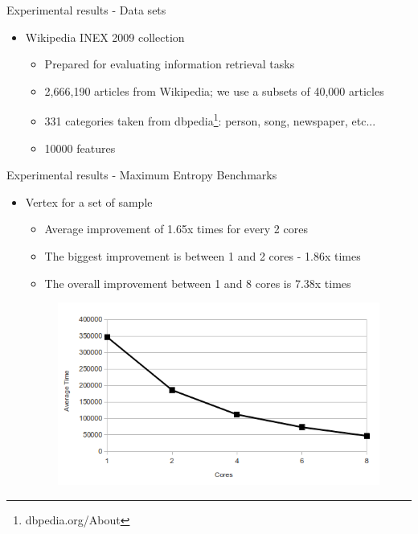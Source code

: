 \documentclass{beamer}
\begin{document}

\begin{frame}{Experimental results - Data sets}

\begin{itemize}
\item Wikipedia INEX 2009 collection \citep{conf/btw/SchenkelSK07}

\begin{itemize}
\item Prepared for evaluating information retrieval tasks
\item 2,666,190 articles from Wikipedia; we use a subsets of 40,000 articles
\item 331 categories taken from dbpedia\footnote{dbpedia.org/About}: person, song, newspaper, etc...
\item 10000 features
\end{itemize}

\end{itemize}

\end{frame}


\begin{frame}{Experimental results - Maximum Entropy Benchmarks}

\begin{itemize}

\item{Vertex for a set of sample}

\begin{itemize}
\item Average improvement of 1.65x times for every 2 cores
\item The biggest improvement is between 1 and 2 cores - 1.86x times
\item The overall improvement between 1 and 8 cores is 7.38x times
\end{itemize}

\begin{figure}[!htb]
  \centering
  \includegraphics[scale=0.35]{maxent_plot.png}
  \label{fig:maxent_plot}
\end{figure}

\end{itemize}

\end{frame}
\end{document}
